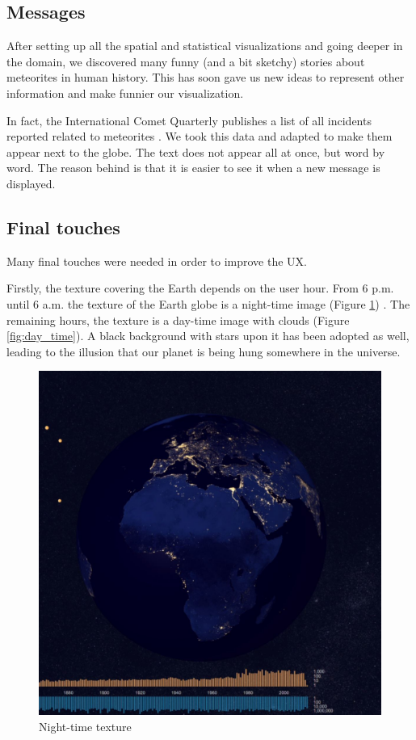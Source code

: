 \documentclass[10pt,conference,compsocconf]{IEEEtran}
\begin{document}
\subsection{Messages}
After setting up all the spatial and statistical visualizations and going deeper in the domain, we discovered many funny (and a bit sketchy) stories about meteorites in human history. This has soon gave us new ideas to represent other information and make funnier our visualization. 

In fact, the International Comet Quarterly publishes a list of all incidents reported related to meteorites \cite{international_comet_quarterly}. We took this data and adapted to make them appear next to the globe. The text does not appear all at once, but word by word. The reason behind is that it is easier to see it when a new message is displayed.



\subsection{Final touches}
Many final touches were needed in order to improve the UX. 

Firstly, the texture covering the Earth depends on the user hour. From 6 p.m. until 6 a.m. the texture of the Earth globe is a night-time image (Figure \ref{fig:night_time}) . The remaining hours, the texture is a day-time image with clouds (Figure \ref{fig:day_time}). A black background with stars upon it has been adopted as well,  leading to the illusion that our planet is being hung somewhere in the universe.


\begin{figure}[H]
  \centering
  \includegraphics[width=.7\columnwidth]{images/night_time_texture}
  \caption{Night-time texture}
  \label{fig:night_time}
\end{figure}
\end{document}
